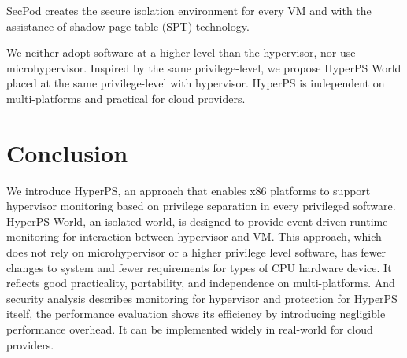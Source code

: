 ﻿\documentclass[conference]{IEEEtran}
\begin{document}
SecPod\cite{Wang2015SecPod} creates the secure isolation environment for every VM and with the assistance of shadow page table (SPT) technology.


We neither adopt software at a higher level than the hypervisor, nor use microhypervisor. Inspired by the same privilege-level, we propose HyperPS World placed at the same privilege-level with hypervisor. HyperPS is independent on multi-platforms and practical for cloud providers.

\section{Conclusion}\label{sec:conclusion}
We introduce HyperPS, an approach that enables x86 platforms to support hypervisor monitoring based on privilege separation in every privileged software. HyperPS World, an isolated world, is designed to provide event-driven runtime monitoring for interaction between hypervisor and VM. This approach, which does not rely on microhypervisor or a higher privilege level software, has fewer changes to system and fewer requirements for types of CPU hardware device. It reflects good practicality, portability, and independence on multi-platforms. And security analysis describes monitoring for hypervisor and protection for HyperPS itself, the performance evaluation shows its efficiency by introducing negligible performance overhead. It can be implemented widely in real-world for cloud providers.









 

\end{document}
